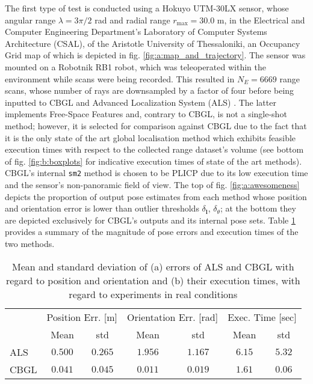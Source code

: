 The first type of test is conducted using a Hokuyo UTM-30LX sensor, whose
angular range $\lambda = 3\pi/2$ rad and radial range $r_{\max} = 30.0$ m,
in the  Electrical and Computer Engineering Department's Laboratory of Computer
Systems Architecture (CSAL), of the Aristotle University of Thessaloniki, an
Occupancy Grid map of which is depicted in fig.
\ref{fig:a:map_and_trajectory}. The sensor was mounted on a Robotnik RB1 robot,
which was teleoperated within the environment while scans were being recorded.
This resulted in $N_E = 6669$ range scans, whose number of rays are downsampled
by a factor of four before being inputted to CBGL and Advanced Localization
System (ALS) \cite{als_jp}. The latter implements Free-Space Features
\cite{als_eth} and, contrary to CBGL, is not a single-shot method;
however, it is selected for comparison against CBGL due to the fact that it is
the only state of the art global localisation method which exhibits feasible
execution times with respect to the collected range dataset's volume (see
bottom of fig.  \ref{fig:b:boxplots} for indicative execution times of state of
the art methods). CBGL's internal \texttt{sm2} method is chosen to be PLICP
\cite{Censi2008c} due to its low execution time and the sensor's non-panoramic
field of view. The top of fig. \ref{fig:a:awesomeness} depicts the proportion
of output pose estimates from each method whose position and orientation error
is lower than outlier thresholds $\delta_{\bm{l}}$, $\delta_{\theta}$; at the
bottom they are depicted exclusively for CBGL's outputs and its internal pose
sets. Table \ref{tbl:a} provides a summary of the magnitude of pose errors and
execution times of the two methods.

\begin{table}[]\footnotesize
\begin{tabular}{@{}lcccccc@{}}
     & \multicolumn{2}{l}{Position Err. {[}m{]}} & \multicolumn{2}{l}{Orientation Err. {[}rad{]}} & \multicolumn{2}{l}{Exec. Time {[}sec{]}} \\
     & Mean              & std              & Mean                & std                 & Mean                & std                \\ \midrule
ALS  & $0.500 $          & $0.265 $         & $1.956 $            & $1.167 $            & $6.15 $             & $5.32 $            \\
CBGL & $0.041 $          & $0.045 $         & $0.011 $            & $0.019 $            & $1.61 $             & $0.06 $            \\ \bottomrule
\end{tabular}
  \caption{\small Mean and standard deviation of (a) errors of ALS and CBGL with
                regard to position and orientation and (b) their execution times,
                with regard to experiments in real conditions}
\label{tbl:a}
\end{table}

